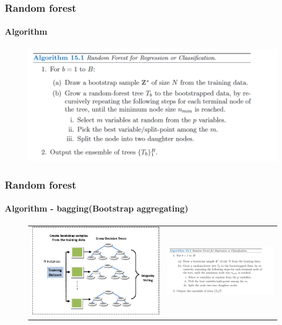 \begin{frame}
	\frametitle{Random forest}
		\framesubtitle{Algorithm}

	\vfill
	
	\begin{figure}
		\includegraphics[width=12cm]{./figures/algorytm}
	\end{figure}

\end{frame}

\begin{frame}
	\frametitle{Random forest}
		\framesubtitle{Algorithm - bagging(Bootstrap aggregating)}
	
		\begin{center}
		\begin{figure}[h]
		\begin{tabular}{ll}
		\includegraphics[width=6cm]{./figures/create}
		&
		\includegraphics[width=5cm]{./figures/algorytm}
		\end{tabular}
		\end{figure}
		\end{center}

\end{frame}


